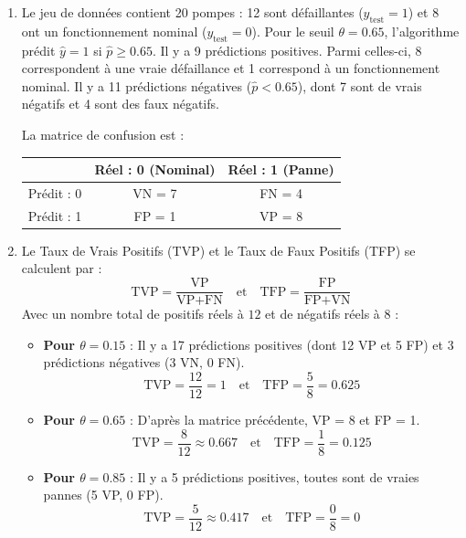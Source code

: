 \documentclass[solutions]{../exercices}
\begin{document}
\begin{solution}
	\begin{enumerate}
		\item Le jeu de données contient 20 pompes : 12 sont défaillantes ($y_{\text{test}}=1$) et 8 ont un fonctionnement nominal ($y_{\text{test}}=0$). 
		Pour le seuil $\theta = 0.65$, l'algorithme prédit $\hat{y}=1$ si $\hat{p} \ge 0.65$. Il y a 9 prédictions positives. Parmi celles-ci, 8 correspondent à une vraie défaillance et 1 correspond à un fonctionnement nominal. Il y a 11 prédictions négatives ($\hat{p} < 0.65$), dont 7 sont de vrais négatifs et 4 sont des faux négatifs.
		
		La matrice de confusion est :
		\begin{table}[h]
			\centering
			\begin{tabular}{|l|c|c|}
				\hline
				& Réel : 0 (Nominal) & Réel : 1 (Panne) \\
				\hline
				Prédit : 0 & VN = 7 & FN = 4 \\
				\hline
				Prédit : 1 & FP = 1 & VP = 8 \\
				\hline
			\end{tabular}
		\end{table}

		\item Le Taux de Vrais Positifs (TVP) et le Taux de Faux Positifs (TFP) se calculent par :
		\[
		\text{TVP} = \frac{\text{VP}}{\text{VP} + \text{FN}} \quad \text{et} \quad \text{TFP} = \frac{\text{FP}}{\text{FP} + \text{VN}}
		\]
		Avec un nombre total de positifs réels à $12$ et de négatifs réels à $8$ :
		\begin{itemize}
			\item \textbf{Pour $\theta = 0.15$} : Il y a 17 prédictions positives (dont 12 VP et 5 FP) et 3 prédictions négatives (3 VN, 0 FN).
			\[
			\text{TVP} = \frac{12}{12} = 1 \quad \text{et} \quad \text{TFP} = \frac{5}{8} = 0.625
			\]
			\item \textbf{Pour $\theta = 0.65$} : D'après la matrice précédente, VP = 8 et FP = 1.
			\[
			\text{TVP} = \frac{8}{12} \approx 0.667 \quad \text{et} \quad \text{TFP} = \frac{1}{8} = 0.125
			\]
			\item \textbf{Pour $\theta = 0.85$} : Il y a 5 prédictions positives, toutes sont de vraies pannes (5 VP, 0 FP).
			\[
			\text{TVP} = \frac{5}{12} \approx 0.417 \quad \text{et} \quad \text{TFP} = \frac{0}{8} = 0
			\]
		\end{itemize}


\end{enumerate}
\end{solution}
\end{document}
